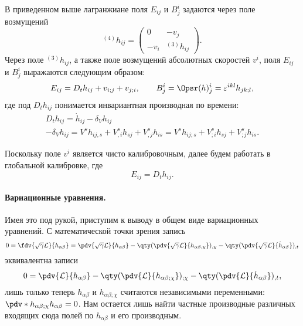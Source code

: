 \documentclass[\docroot/reports/draft/report.tex]{subfiles}
\begin{document}
    В приведенном выше лагранжиане поля $E_{ij}$ и $B^i_j$ задаются через поле возмущений
    \begin{equation}
        {}^{(4)}h_{ij} = \begin{pmatrix}
            0    & - v_j          \\
            -v_i & {}^{(3)}h_{ij}
        \end{pmatrix} .
    \end{equation}
    Через поле ${}^{(3)}h_{ij}$, а также поле возмущений абсолютных скоростей $v^i$, поля $E_{ij}$ и $B^i_j$ выражаются следующим образом:
    \begin{equation}
        E_{ij} = D_t{h}_{ij} + v_{i;j} + v_{j;i}, \qquad
        B^i_j = \Opsr(h)^i_j = \varepsilon^{ikl} h_{jk;l} ,
    \end{equation}
    где под $D_t{h}_{ij}$ понимается инвариантная производная по времени:
    \begin{gather}
        D_t{h}_{ij} =
            \dot{h}_{ij} - \delta_{V} h_{ij}\\
        -\delta_{V} h_{ij} =
            V^s h_{ij,s} + V^s_{,i} h_{sj} + V^s_{,j} h_{is} =
            V^s h_{ij;s} + V^s_{;i} h_{sj} + V^s_{;j} h_{is} .
    \end{gather}

    Поскольку поле $v^i$ является чисто калибровочным, далее будем работать в глобальной калибровке, где
    \begin{equation}
        E_{ij} = D_t{h}_{ij} .
    \end{equation}

    \paragraph{Вариационные уравнения.}

    Имея это под рукой, приступим к выводу в общем виде вариационных уравнений. С математической точки зрения запись
    \begin{equation*}
        0 = \fdv{\sqrt{\gamma}\mathcal{L}}{h_{\alpha\beta}} =
            \pdv{\sqrt{\gamma}\mathcal{L}}{h_{\alpha\beta}} -
            \qty(\pdv{\sqrt{\gamma}\mathcal{L}}{h_{\alpha\beta,\chi}})_{,\chi} -
            \qty(\pdv{\sqrt{\gamma}\mathcal{L}}{\dot{h}_{\alpha\beta}})_{,t}
    \end{equation*}
    эквивалентна записи
    \begin{equation*}
        0 =
            \pdv{\mathcal{L}}{h_{\alpha\beta}} -
            \qty(\pdv{\mathcal{L}}{h_{\alpha\beta;\chi}})_{;\chi} -
            \qty(\pdv{\mathcal{L}}{\dot{h}_{\alpha\beta}})_{,t} ,
    \end{equation*}
    лишь только теперь $h_{\alpha\beta}$ и $h_{\alpha\beta;\chi}$ считаются независимыми переменными: $\pdv*{h_{\alpha\beta;\chi}}{h_{\alpha\beta}} = 0$. Нам остается лишь найти частные производные различных входящих сюда полей по $h_{\alpha\beta}$ и его производным.
\end{document}
